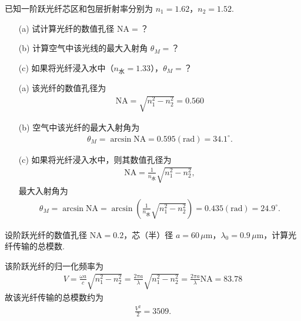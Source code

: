 \documentclass{assignment}
\begin{document}
\begin{prob}
    已知一阶跃光纤芯区和包层折射率分别为 $n_1=1.62$，$n_2=1.52$.
    \begin{itemize}
        \item[(a)] 试计算光纤的数值孔径 NA$=$？
        \item[(b)] 计算空气中该光线的最大入射角 $\theta_M=$？
        \item[(c)] 如果将光纤浸入水中（$n_{\text{水}}=1.33$），$\theta_M=$？
    \end{itemize}
\end{prob}
\begin{sol}
    \begin{itemize}
        \item[(a)] 该光纤的数值孔径为
        \begin{align}
            \text{NA}=\sqrt{n_1^2-n_2^2}=0.560
        \end{align}
        \item[(b)] 空气中该光纤的最大入射角为
        \begin{align}
            \theta_M=\arcsin\text{NA}=0.595(\text{rad})=34.1^{\circ}.
        \end{align}
        \item[(c)] 如果将光纤浸入水中，则其数值孔径为
        \begin{align}
            \text{NA}=\frac{1}{n_{\text{水}}}\sqrt{n_1^2-n_2^2},
        \end{align}
        最大入射角为
        \begin{align}
            \theta_M=\arcsin\text{NA}=\arcsin\left(\frac{1}{n_{\text{水}}}\sqrt{n_1^2-n_2^2}\right)=0.435(\text{rad})=24.9^{\circ}.
        \end{align}
    \end{itemize}
\end{sol}

\begin{prob}
    设阶跃光纤的数值孔径 NA$=0.2$，芯（半）径 $a=60\,\mu$m，$\lambda_0=0.9\,\mu$m，计算光纤传输的总模数.
\end{prob}
\begin{sol}
    该阶跃光纤的归一化频率为
    \begin{align}
        V=\frac{\omega a}{c}\sqrt{n_1^2-n_2^2}=\frac{2\pi a}{\lambda}\sqrt{n_1^2-n_2^2}=\frac{2\pi a}{\lambda}\text{NA}=83.78
    \end{align}
    故该光纤传输的总模数约为
    \begin{align}
        \frac{V^2}{2}=3509.
    \end{align}
\end{sol}
\end{document}
